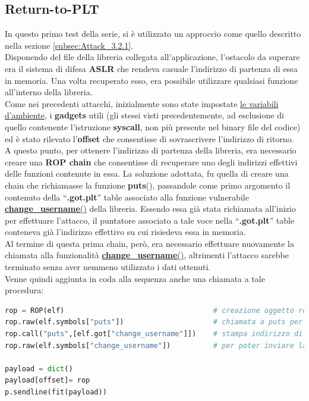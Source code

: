 \subsection{Return-to-PLT}
\label{subsec:Test_3-1}
In questo primo test della serie, si è utilizzato un approccio come quello descritto nella sezione \ref{subsec:Attack_3.2.1}.\\
Disponendo del file della libreria collegata all'applicazione, l'ostacolo da superare 
era il sistema di difesa \textbf{ASLR} che rendeva casuale l'indirizzo di partenza di essa in memoria. Una volta recuperato esso, era possibile utilizzare qualsiasi funzione all'interno della libreria.\\
Come nei precedenti attacchi, inizialmente sono state impostate \hyperref[env]{le variabili d'ambiente}, i \textbf{gadgets} utili (gli stessi visti precedentemente, ad esclusione di quello contenente l'istruzione 
\textbf{syscall}, non più presente nel binary file del codice) ed è stato rilevato l'\textbf{offset} che consentisse di sovrascrivere l'indirizzo di ritorno.\\
A questo punto, per ottenere l'indirizzo di partenza della libreria, era necessario creare una \textbf{ROP chain} che consentisse di recuperare uno degli indirizzi effettivi delle funzioni contenute in essa. La soluzione adottata, 
fu quella di creare una chain che richiamasse la funzione \textbf{puts}(), passandole come primo argomento il contenuto della ``\textbf{.got.plt}'' table associato alla funzione vulnerabile \hyperref[change username]{\textbf{change\_username}()}
della libreria. Essendo essa già stata richiamata all'inizio per effettuare l'attacco, il puntatore associato a tale voce nella ``\textbf{.got.plt}'' table conteneva già l'indirizzo effettivo su cui risiedeva essa in memoria.\\
Al termine di questa prima chain, però, era necessario effettuare nuovamente la chiamata alla funzionalità \hyperref[change username]{\textbf{change\_username}()}, altrimenti l'attacco sarebbe terminato senza aver nemmeno utilizzato i dati ottenuti.\\ 
Venne quindi aggiunta in coda alla sequenza anche una chiamata a tale procedura:
\begin{lstlisting}[language=Python, label=rop1-idx, caption={Creazione e invio della prima \textbf{ROP chain}, per stampare l'indirizzo effettivo in memoria di \textbf{change\_username}() e continuare l'attacco.}, style =Python]
rop = ROP(elf)                                   # creazione oggetto rop
rop.raw(elf.symbols["puts"])                     # chiamata a puts per stampare '\n'
rop.call("puts",[elf.got["change_username"]])    # stampa indirizzo di change_username
rop.raw(elf.symbols["change_username"])          # per poter inviare la seconda chain

payload = dict()                    
payload[offset]= rop
p.sendline(fit(payload))            
\end{lstlisting}
